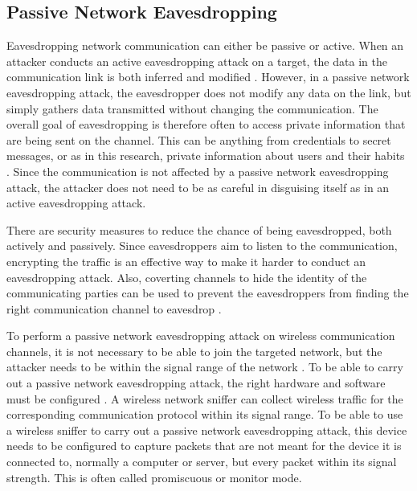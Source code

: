 \subsection{Passive Network Eavesdropping}
Eavesdropping network communication can either be passive or active. When an attacker conducts an active eavesdropping attack on a target, the data in the communication link is both inferred and modified \cite{Eavesdropping}. However, in a passive network eavesdropping attack, the eavesdropper does not modify any data on the link, but simply gathers data transmitted without changing the communication. The overall goal of eavesdropping is therefore often to access private information that are being sent on the channel. This can be anything from credentials to secret messages, or as in this research, private information about users and their habits \cite{Eavesdropping}. Since the communication is not affected by a passive network eavesdropping attack, the attacker does not need to be as careful in disguising itself as in an active eavesdropping attack.  

There are security measures to reduce the chance of being eavesdropped, both actively and passively. Since eavesdroppers aim to listen to the communication, encrypting the traffic is an effective way to make it harder to conduct an eavesdropping attack. Also, coverting channels to hide the identity of the communicating parties can be used to prevent the eavesdroppers from finding the right communication channel to eavesdrop \cite{Eavesdropping}.

To perform a passive network eavesdropping attack on wireless communication channels, it is not necessary to be able to join the targeted network, but the attacker needs to be within the signal range of the network \cite{WifiEavesdropEnc}. To be able to carry out a passive network eavesdropping attack, the right hardware and software must be configured \cite{Sniffingtech}. A wireless network sniffer can collect wireless traffic for the corresponding communication protocol within its signal range. To be able to use a wireless sniffer to carry out a passive network eavesdropping attack, this device needs to be configured to capture packets that are not meant for the device it is connected to, normally a computer or server, but every packet within its signal strength. This is often called promiscuous or monitor mode. 

